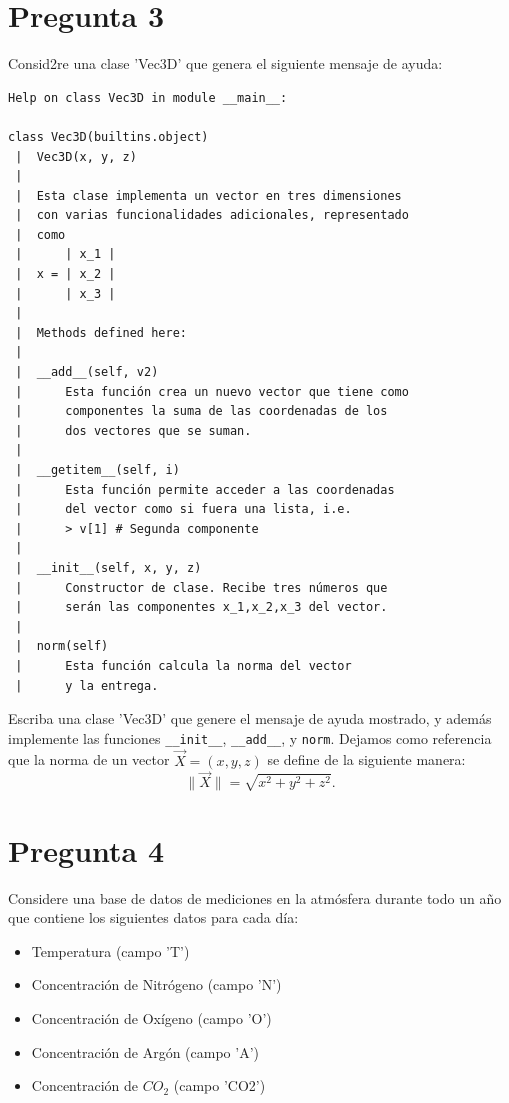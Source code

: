 \documentclass{article}
\begin{document}
\section*{Pregunta 3}
Consid2re una clase 'Vec3D' que genera el siguiente mensaje de ayuda:
    \begin{verbatim}
Help on class Vec3D in module __main__:

class Vec3D(builtins.object)
 |  Vec3D(x, y, z)
 |  
 |  Esta clase implementa un vector en tres dimensiones
 |  con varias funcionalidades adicionales, representado 
 |  como 
 |      | x_1 |
 |  x = | x_2 |
 |      | x_3 |
 |  
 |  Methods defined here:
 |  
 |  __add__(self, v2)
 |      Esta función crea un nuevo vector que tiene como 
 |      componentes la suma de las coordenadas de los
 |      dos vectores que se suman.
 |  
 |  __getitem__(self, i)
 |      Esta función permite acceder a las coordenadas 
 |      del vector como si fuera una lista, i.e.
 |      > v[1] # Segunda componente
 |  
 |  __init__(self, x, y, z)
 |      Constructor de clase. Recibe tres números que 
 |      serán las componentes x_1,x_2,x_3 del vector.
 |  
 |  norm(self)
 |      Esta función calcula la norma del vector
 |      y la entrega.

    \end{verbatim}
Escriba una clase 'Vec3D' que genere el mensaje de ayuda mostrado, y además implemente las funciones \texttt{\_\_init\_\_}, \texttt{\_\_add\_\_}, y \texttt{norm}. Dejamos como referencia que la norma de un vector $\vec X = (x,y,z)$ se define de la siguiente manera:
    $$ \| \vec X \| = \sqrt{x^2 + y^2 + z^2} . $$
\section*{Pregunta 4}
Considere una base de datos de mediciones en la atmósfera durante todo un año que contiene los siguientes datos para cada día: 
    \begin{itemize}
        \item Temperatura (campo 'T')
        \item Concentración de Nitrógeno (campo 'N')
        \item Concentración de Oxígeno (campo 'O')
        \item Concentración de Argón (campo 'A')
        \item Concentración de $CO_2$ (campo 'CO2')
    \end{itemize}
\end{document}
